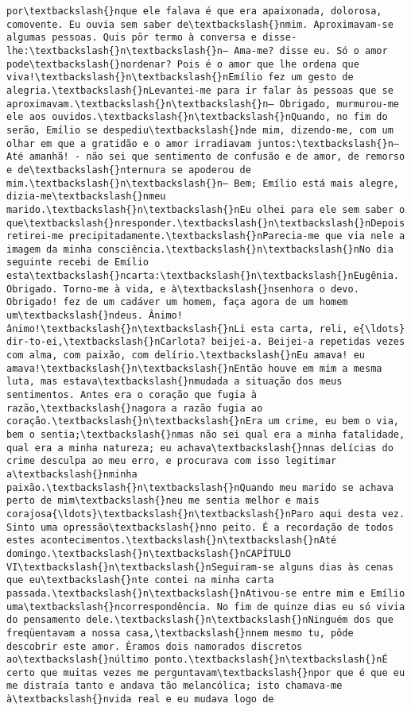 \documentclass[11pt]{article}
\begin{document}
\begin{Verbatim}[commandchars=\\\{\}]
por\textbackslash{}nque ele falava é que era apaixonada, dolorosa, comovente. Eu ouvia sem saber de\textbackslash{}nmim. Aproximavam-se algumas pessoas. Quis pôr termo à conversa e disse-lhe:\textbackslash{}n\textbackslash{}n— Ama-me? disse eu. Só o amor pode\textbackslash{}nordenar? Pois é o amor que lhe ordena que viva!\textbackslash{}n\textbackslash{}nEmílio fez um gesto de alegria.\textbackslash{}nLevantei-me para ir falar às pessoas que se aproximavam.\textbackslash{}n\textbackslash{}n— Obrigado, murmurou-me ele aos ouvidos.\textbackslash{}n\textbackslash{}nQuando, no fim do serão, Emílio se despediu\textbackslash{}nde mim, dizendo-me, com um olhar em que a gratidão e o amor irradiavam juntos:\textbackslash{}n— Até amanhã! - não sei que sentimento de confusão e de amor, de remorso e de\textbackslash{}nternura se apoderou de mim.\textbackslash{}n\textbackslash{}n— Bem; Emílio está mais alegre, dizia-me\textbackslash{}nmeu marido.\textbackslash{}n\textbackslash{}nEu olhei para ele sem saber o que\textbackslash{}nresponder.\textbackslash{}n\textbackslash{}nDepois retirei-me precipitadamente.\textbackslash{}nParecia-me que via nele a imagem da minha consciência.\textbackslash{}n\textbackslash{}nNo dia seguinte recebi de Emílio esta\textbackslash{}ncarta:\textbackslash{}n\textbackslash{}nEugênia. Obrigado. Torno-me à vida, e à\textbackslash{}nsenhora o devo. Obrigado! fez de um cadáver um homem, faça agora de um homem um\textbackslash{}ndeus. Ânimo! ânimo!\textbackslash{}n\textbackslash{}nLi esta carta, reli, e{\ldots} dir-to-ei,\textbackslash{}nCarlota? beijei-a. Beijei-a repetidas vezes com alma, com paixão, com delírio.\textbackslash{}nEu amava! eu amava!\textbackslash{}n\textbackslash{}nEntão houve em mim a mesma luta, mas estava\textbackslash{}nmudada a situação dos meus sentimentos. Antes era o coração que fugia à razão,\textbackslash{}nagora a razão fugia ao coração.\textbackslash{}n\textbackslash{}nEra um crime, eu bem o via, bem o sentia;\textbackslash{}nmas não sei qual era a minha fatalidade, qual era a minha natureza; eu achava\textbackslash{}nnas delícias do crime desculpa ao meu erro, e procurava com isso legitimar a\textbackslash{}nminha paixão.\textbackslash{}n\textbackslash{}nQuando meu marido se achava perto de mim\textbackslash{}neu me sentia melhor e mais corajosa{\ldots}\textbackslash{}n\textbackslash{}nParo aqui desta vez. Sinto uma opressão\textbackslash{}nno peito. É a recordação de todos estes acontecimentos.\textbackslash{}n\textbackslash{}nAté domingo.\textbackslash{}n\textbackslash{}nCAPÍTULO VI\textbackslash{}n\textbackslash{}nSeguiram-se alguns dias às cenas que eu\textbackslash{}nte contei na minha carta passada.\textbackslash{}n\textbackslash{}nAtivou-se entre mim e Emílio uma\textbackslash{}ncorrespondência. No fim de quinze dias eu só vivia do pensamento dele.\textbackslash{}n\textbackslash{}nNinguém dos que freqüentavam a nossa casa,\textbackslash{}nnem mesmo tu, pôde descobrir este amor. Éramos dois namorados discretos ao\textbackslash{}núltimo ponto.\textbackslash{}n\textbackslash{}nÉ certo que muitas vezes me perguntavam\textbackslash{}npor que é que eu me distraía tanto e andava tão melancólica; isto chamava-me à\textbackslash{}nvida real e eu mudava logo de 
\end{Verbatim}
\end{document}
